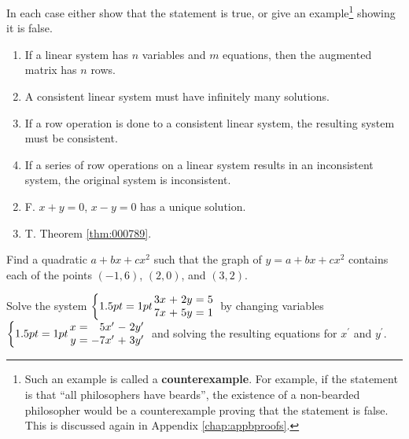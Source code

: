 \begin{multicols}{2}
\begin{ex}
In each case either show that the statement is true, or give an example\footnote{Such an example is called a \textbf{counterexample}. For example, if the statement is that ``all philosophers have beards'', the existence of a non-bearded philosopher would be a counterexample proving that the statement is false. This is discussed again in Appendix \ref{chap:appbproofs}.} showing it is false.

\begin{enumerate}[label={\alph*.}]
\item If a linear system has $n$ variables and $m$ equations, then the augmented matrix has $n$ rows.

\item A consistent linear system must have infinitely many solutions.

\item If a row operation is done to a consistent linear system, the resulting system must be consistent.

\item If a series of row operations on a linear system results in an inconsistent system, the original system is inconsistent.

\end{enumerate}
\begin{sol}
\begin{enumerate}[label={\alph*.}]
\setcounter{enumi}{1}
\item  F. $x + y = 0$, $x - y = 0$ has a unique solution.

\setcounter{enumi}{3}
\item  T. Theorem \ref{thm:000789}.

\end{enumerate}
\end{sol}
\end{ex}

\begin{ex}
Find a quadratic $a + bx + cx^2$ such that the graph of $y = a + bx + cx^2$ contains each of the points $(-1, 6)$, $(2, 0)$, and $(3, 2)$.
\end{ex}

\begin{ex}
Solve the system
$\left \{
\arraycolsep=1pt
\begin{array}{rlrcr}
	3x & + & 2y & = & 5 \\
	7x & + & 5y & = & 1 
\end{array} \right.$ by changing variables $
\left \{
\arraycolsep=1pt
\begin{array}{rcrlr}
	x & = & 5x^\prime & - & 2y^\prime \\
	y & = & -7x^\prime & + & 3y^\prime 
\end{array} \right.
$ and solving the resulting equations for $x^\prime$ and $y^\prime$.


\end{ex}
\end{multicols}
